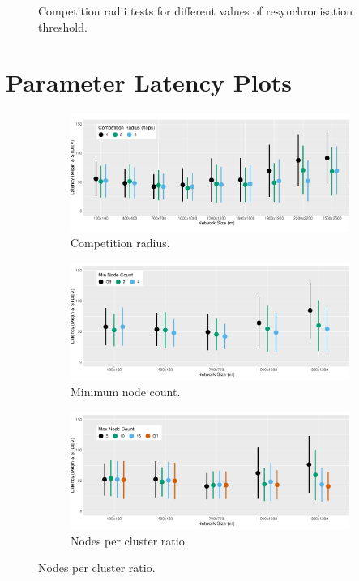 \begin{figure}[H]
    \caption{Competition radii tests for different values of resynchronisation threshold.}
    \label{fig:resync-treshold-tests-latency}
\end{figure}

\section{Parameter Latency Plots}
\begin{figure}[H]
    
\centering
\begin{subfigure}{\textwidth}
    \centering
    \includegraphics[width=\textwidth, keepaspectratio]{figure/Results/ParameterEvaluation/Latency/CompetitionRadius_Latency.pdf}
    \caption{Competition radius.}
    \label{subfig:competition-radius-latency}
\end{subfigure}
\begin{subfigure}{\textwidth}
    \centering
    \includegraphics[width=\textwidth, keepaspectratio]{figure/Results/ParameterEvaluation/Latency/MinNodeCount_Latency.pdf}
    \caption{Minimum node count.}
    \label{subfig:min-node-count-latency}
\end{subfigure}
\begin{subfigure}{\textwidth}
    \centering
    \includegraphics[width=\textwidth, keepaspectratio]{figure/Results/ParameterEvaluation/Latency/MaxNodeCount_Latency.pdf}
    \caption{Nodes per cluster ratio.}
    \label{subfig:max-node-count-latency}
\end{subfigure}


\end{figure}
